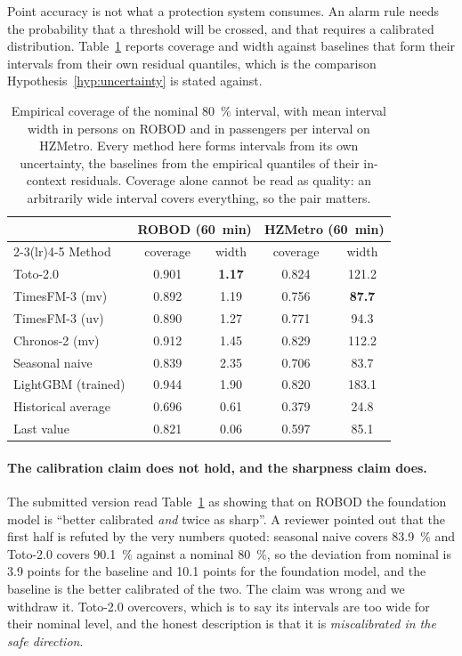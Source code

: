 \documentclass[11pt]{article}
\theoremstyle{plain}
\theoremstyle{definition}
\theoremstyle{remark}
\newcommand{\best}[1]{\textbf{#1}}
\newif\ifrevisionmarkup
\newcommand{\new}[1]{\ifrevisionmarkup\textcolor{revision}{#1}\else#1\fi}
\begin{document}
Point accuracy is not what a protection system consumes. An alarm rule needs the probability that a threshold will be crossed, and that requires a calibrated distribution. Table~\ref{tab:calibration} reports coverage and width against baselines that form their intervals from their own residual quantiles, which is the comparison Hypothesis~\ref{hyp:uncertainty} is stated against.

\begin{table}[htbp]
\centering
\caption{Empirical coverage of the nominal \SI{80}{\percent} interval, with mean interval width in persons on ROBOD and in passengers per interval on HZMetro. Every method here forms intervals from its own uncertainty, the baselines from the empirical quantiles of their in-context residuals. Coverage alone cannot be read as quality: an arbitrarily wide interval covers everything, so the pair matters.}
\label{tab:calibration}
\small
\begin{tabular}{lcccc}
\toprule
& \multicolumn{2}{c}{ROBOD (\SI{60}{\minute})} & \multicolumn{2}{c}{HZMetro (\SI{60}{\minute})} \\
\cmidrule(lr){2-3}\cmidrule(lr){4-5}
Method & coverage & width & coverage & width \\
\midrule
Toto-2.0            & 0.901 & \best{1.17} & 0.824 & 121.2 \\
TimesFM-3 (mv)      & 0.892 & 1.19 & 0.756 & \best{87.7} \\
TimesFM-3 (uv)      & 0.890 & 1.27 & 0.771 & 94.3 \\
Chronos-2 (mv)      & 0.912 & 1.45 & 0.829 & 112.2 \\
\midrule
Seasonal naive      & 0.839 & 2.35 & 0.706 & 83.7 \\
LightGBM (trained)  & 0.944 & 1.90 & 0.820 & 183.1 \\
Historical average  & 0.696 & 0.61 & 0.379 & 24.8 \\
Last value          & 0.821 & 0.06 & 0.597 & 85.1 \\
\bottomrule
\end{tabular}
\end{table}

\new{\paragraph{The calibration claim does not hold, and the sharpness claim does.}
\label{sec:calib}
The submitted version read Table~\ref{tab:calibration} as showing that on ROBOD the foundation model is ``better calibrated \emph{and} twice as sharp''. A reviewer pointed out that the first half is refuted by the very numbers quoted: seasonal naive covers \SI{83.9}{\percent} and Toto-2.0 covers \SI{90.1}{\percent} against a nominal \SI{80}{\percent}, so the deviation from nominal is \num{3.9} points for the baseline and \num{10.1} points for the foundation model, and the baseline is the better calibrated of the two. The claim was wrong and we withdraw it. Toto-2.0 overcovers, which is to say its intervals are too wide for their nominal level, and the honest description is that it is \emph{miscalibrated in the safe direction}.}
\end{document}
